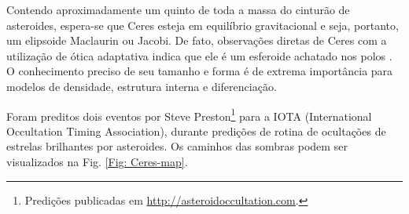 \documentclass[12pt,a4paper]{report}
\begin{document}
Contendo aproximadamente um quinto de toda a massa do cinturão de asteroides, espera-se que Ceres esteja em equilíbrio gravitacional e seja, portanto, um elipsoide Maclaurin ou Jacobi. De fato, observações diretas de Ceres com a utilização de ótica adaptativa indica que ele é um esferoide achatado nos polos \citep{Drummond2014}. O conhecimento preciso de seu tamanho e forma é de extrema importância para modelos de densidade, estrutura interna e diferenciação.


Foram preditos dois eventos por Steve Preston\footnote{Predições publicadas em \url{http://asteroidoccultation.com}.} para a IOTA (International Occultation Timing Association), durante predições de rotina de ocultações de estrelas brilhantes por asteroides. Os caminhos das sombras podem ser visualizados na Fig. \ref{Fig: Ceres-map}.
\end{document}
